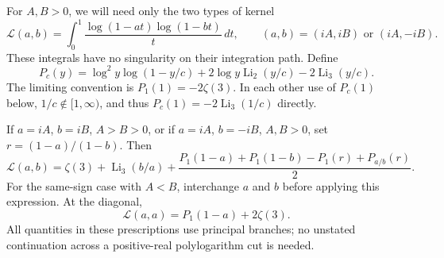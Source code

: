 For $A,B>0$, we will need only the two types of kernel
\begin{equation}\label{xid:wat:eq:Ldef}
 \mathcal L(a,b)=\int_0^1
        \frac{\log(1-at)\log(1-bt)}{t}\,dt,
 \qquad (a,b)=(iA,iB)\text{ or }(iA,-iB).
\end{equation}
These integrals have no singularity on their integration path. Define
\begin{equation}\label{xid:wat:eq:P}
 P_c(y)=\log^2y\log(1-y/c)
       +2\log y\operatorname{Li}_2(y/c)
       -2\operatorname{Li}_3(y/c).
\end{equation}
The limiting convention is $P_1(1)=-2\zeta(3)$. In each other use of
$P_c(1)$ below, $1/c\notin[1,\infty)$, and thus
$P_c(1)=-2\operatorname{Li}_3(1/c)$ directly.

\begin{lemma}
\label{xid:wat:lem:L}
If $a=iA$, $b=iB$, $A>B>0$, or if $a=iA$, $b=-iB$, $A,B>0$, set
$r=(1-a)/(1-b)$. Then
\begin{equation}\label{xid:wat:eq:Lclosed}
 \boxed{\displaystyle
 \mathcal L(a,b)=\zeta(3)+\operatorname{Li}_3(b/a)
 +\frac{P_1(1-a)+P_1(1-b)-P_1(r)+P_{a/b}(r)}2.}
\end{equation}
For the same-sign case with $A<B$, interchange $a$ and $b$ before
applying this expression. At the diagonal,
\begin{equation}\label{xid:wat:eq:Ldiagonal}
 \mathcal L(a,a)=P_1(1-a)+2\zeta(3).
\end{equation}
All quantities in these prescriptions use principal branches; no
unstated continuation across a positive-real polylogarithm cut is needed.
\end{lemma}

